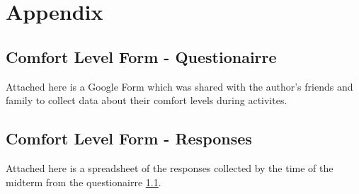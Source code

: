 \clearpage
\section{Appendix}
\label{appendix}

\subsection{Comfort Level Form - Questionairre}
\label{appendix:comfort_form}
Attached here is a Google Form which was shared with the author's friends and family to collect data about their
comfort levels during activites.




\subsection{Comfort Level Form - Responses}
\label{appendix:comfort_responses}
Attached here is a spreadsheet of the responses collected by the time of the midterm from the questionairre
\ref{appendix:comfort_form}.



